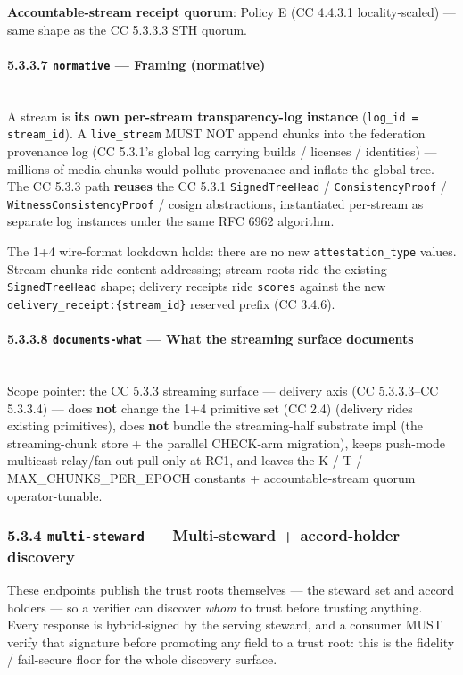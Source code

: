 \documentclass[11pt]{article}
\begin{document}
\textbf{Accountable-stream receipt quorum}: Policy E (CC 4.4.3.1 locality-scaled) — same shape as the CC 5.3.3.3 STH quorum.


\paragraph{5.3.3.7 \texttt{normative} — Framing (normative)}\mbox{}\\


A stream is \textbf{its own per-stream transparency-log instance} (\texttt{log\_id = stream\_id}). A \texttt{live\_stream} MUST NOT append chunks into the federation provenance log (CC 5.3.1's global log carrying builds / licenses / identities) — millions of media chunks would pollute provenance and inflate the global tree. The CC 5.3.3 path \textbf{reuses} the CC 5.3.1 \texttt{SignedTreeHead} / \texttt{ConsistencyProof} / \texttt{WitnessConsistencyProof} / cosign abstractions, instantiated per-stream as separate log instances under the same RFC 6962 algorithm.


The 1+4 wire-format lockdown holds: there are no new \texttt{attestation\_type} values. Stream chunks ride content addressing; stream-roots ride the existing \texttt{SignedTreeHead} shape; delivery receipts ride \texttt{scores} against the new \texttt{delivery\_receipt:\{stream\_id\}} reserved prefix (CC 3.4.6).


\paragraph{5.3.3.8 \texttt{documents-what} — What the streaming surface documents}\mbox{}\\


Scope pointer: the CC 5.3.3 streaming surface — delivery axis (CC 5.3.3.3–CC 5.3.3.4) — does \textbf{not} change the 1+4 primitive set (CC 2.4) (delivery rides existing primitives), does \textbf{not} bundle the streaming-half substrate impl (the streaming-chunk store + the parallel CHECK-arm migration), keeps push-mode multicast relay/fan-out pull-only at RC1, and leaves the K / T / MAX\_CHUNKS\_PER\_EPOCH constants + accountable-stream quorum operator-tunable.


\subsubsection*{5.3.4 \texttt{multi-steward} — Multi-steward + accord-holder discovery}


These endpoints publish the trust roots themselves — the steward set and accord holders — so a verifier can discover \textit{whom} to trust before trusting anything. Every response is hybrid-signed by the serving steward, and a consumer MUST verify that signature before promoting any field to a trust root: this is the fidelity / fail-secure floor for the whole discovery surface.
\end{document}
